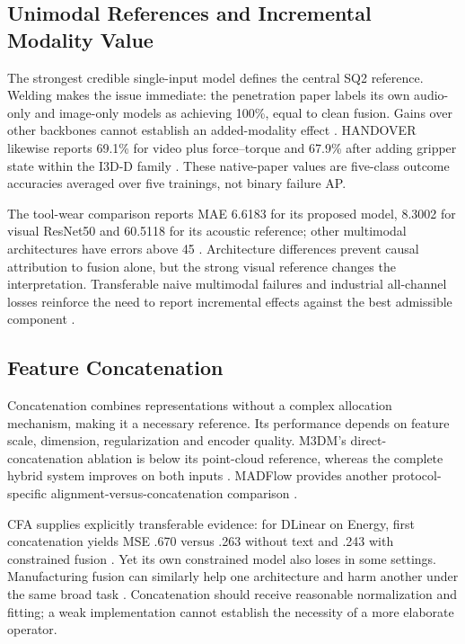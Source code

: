 \subsection{Unimodal References and Incremental Modality Value}
The strongest credible single-input model defines the central SQ2 reference. Welding makes the issue immediate: the penetration paper labels its own audio-only and image-only models as achieving 100\%, equal to clean fusion. Gains over other backbones cannot establish an added-modality effect \citep[PDF pp.~18, 22]{Hua2026Weld}. HANDOVER likewise reports 69.1\% for video plus force--torque and 67.9\% after adding gripper state within the I3D-D family \citep[PDF p.~7, Table~III]{Thoduka2024Handover}. These native-paper values are five-class outcome accuracies averaged over five trainings, not binary failure AP.

The tool-wear comparison reports MAE 6.6183 for its proposed model, 8.3002 for visual ResNet50 and 60.5118 for its acoustic reference; other multimodal architectures have errors above 45 \citep[PDF p.~24, Table~1]{P045}. Architecture differences prevent causal attribution to fusion alone, but the strong visual reference changes the interpretation. Transferable naive multimodal failures and industrial all-channel losses reinforce the need to report incremental effects against the best admissible component \citep{Wang2020What,Goodarzi2023Deep}.

\subsection{Feature Concatenation}
Concatenation combines representations without a complex allocation mechanism, making it a necessary reference. Its performance depends on feature scale, dimension, regularization and encoder quality. M3DM's direct-concatenation ablation is below its point-cloud reference, whereas the complete hybrid system improves on both inputs \citep[Table~4]{Wang2023Multimodal}. MADFlow provides another protocol-specific alignment-versus-concatenation comparison \citep{Li2025MADFlow}.

CFA supplies explicitly transferable evidence: for DLinear on Energy, first concatenation yields MSE .670 versus .263 without text and .243 with constrained fusion \citep[PDF p.~4, Table~4]{P023}. Yet its own constrained model also loses in some settings. Manufacturing fusion can similarly help one architecture and harm another under the same broad task \citep[Table~3]{Li2022A}. Concatenation should receive reasonable normalization and fitting; a weak implementation cannot establish the necessity of a more elaborate operator.

